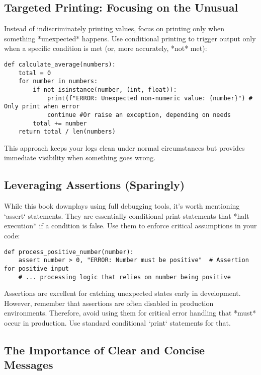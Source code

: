 \documentclass{article}
\begin{document}
{{{\subsection*{Targeted Printing: Focusing on the Unusual}

Instead of indiscriminately printing values, focus on printing only when something *unexpected* happens.  Use conditional printing to trigger output only when a specific condition is met (or, more accurately, *not* met):

\begin{verbatim}
def calculate_average(numbers):
    total = 0
    for number in numbers:
        if not isinstance(number, (int, float)):
            print(f"ERROR: Unexpected non-numeric value: {number}") # Only print when error
            continue #Or raise an exception, depending on needs
        total += number
    return total / len(numbers)
\end{verbatim}

This approach keeps your logs clean under normal circumstances but provides immediate visibility when something goes wrong.

\subsection*{Leveraging Assertions (Sparingly)}

While this book downplays using full debugging tools, it's worth mentioning `assert` statements. They are essentially conditional print statements that *halt execution* if a condition is false. Use them to enforce critical assumptions in your code:

\begin{verbatim}
def process_positive_number(number):
    assert number > 0, "ERROR: Number must be positive"  # Assertion for positive input
    # ... processing logic that relies on number being positive
\end{verbatim}

Assertions are excellent for catching unexpected states early in development. However, remember that assertions are often disabled in production environments. Therefore, avoid using them for critical error handling that *must* occur in production.  Use standard conditional `print` statements for that.

\subsection*{The Importance of Clear and Concise Messages}

}}}
\end{document}
